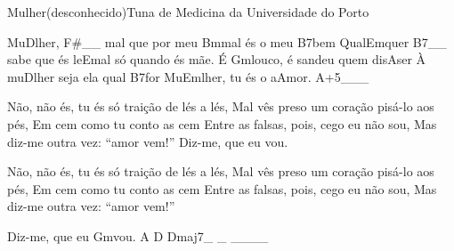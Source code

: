 \begin{musica}{Mulher}{(desconhecido)}{Tuna de Medicina da Universidade do Porto}

Mu\ac{D}{lher}, \ac{F#}{}__ mal que por meu \ac{Bm}{mal} és o meu \ac{B7}{bem}
Qual\ac{Em}{quer} \ac{B7}{}__ sabe que és le\ac{Em}{al} só quando és mãe.
É \ac{Gm}{lou}co, é sandeu quem dis\ac{A}{ser}
À mu\ac{D}{lher} seja ela qual \ac{B7}{for}
Mu\ac{Em}{lher}, tu és o a\ac{A}{mor}. \ac{A+5}{}___

Não, não és, tu és só traição de lés a lés,
Mal vês preso um coração pisá-lo aos pés,
Em cem como tu conto as cem
Entre as falsas, pois, cego eu não sou,
Mas diz-me outra vez: “amor vem!”
Diz-me, que eu vou.


Não, não és, tu és só traição de lés a lés,
Mal vês preso um coração pisá-lo aos pés,
Em cem como tu conto as cem
Entre as falsas, pois, cego eu não sou,
Mas diz-me outra vez: “amor vem!”

Diz-me, que eu \ac{Gm}{vou}. \ac{A D Dmaj7}{}_ _ ____

\end{musica}
